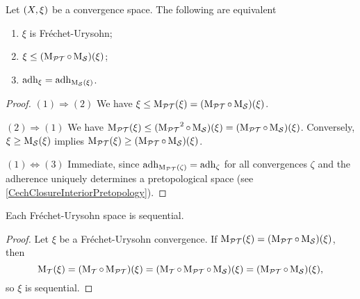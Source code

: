 \begin{lemma} \label{FrechetUrysohnLemma}
Let $\sSet{X,\xi}$ be a convergence space. The following are equivalent
\begin{enumerate}
\item $\xi$ is Fréchet-Urysohn;
\item $\xi \leq (\pretopMod\circ \seqMod)(\xi)$;
\item $\adh_\xi = \adh_{\seqMod(\xi)}$.
\end{enumerate}
\end{lemma}
\begin{proof}
$(1) \Rightarrow (2)$ We have $\xi\leq \pretopMod(\xi) = (\pretopMod\circ \seqMod)(\xi)$.

$(2) \Rightarrow (1)$ We have $\pretopMod(\xi) \leq (\pretopMod^2\circ \seqMod)(\xi) = (\pretopMod\circ \seqMod)(\xi)$. Conversely, $\xi \geq \seqMod(\xi)$ implies $\pretopMod(\xi) \geq (\pretopMod\circ \seqMod)(\xi)$.

$(1) \Leftrightarrow (3)$ Immediate, since $\adh_{\pretopMod(\zeta)} = \adh_\zeta$ for all convergences $\zeta$ and the adherence uniquely determines a pretopological space (see \ref{CechClosureInteriorPretopology}). 
\end{proof}

\begin{lemma}
Each Fréchet-Urysohn space is sequential.
\end{lemma}
\begin{proof}
Let $\xi$ be a Fréchet-Urysohn convergence. If $\pretopMod(\xi) = (\pretopMod\circ \seqMod)(\xi)$, then
\[ \topMod(\xi) = (\topMod\circ\pretopMod)(\xi) = (\topMod\circ\pretopMod\circ \seqMod)(\xi) = (\pretopMod\circ \seqMod)(\xi), \]
so $\xi$ is sequential.
\end{proof}

